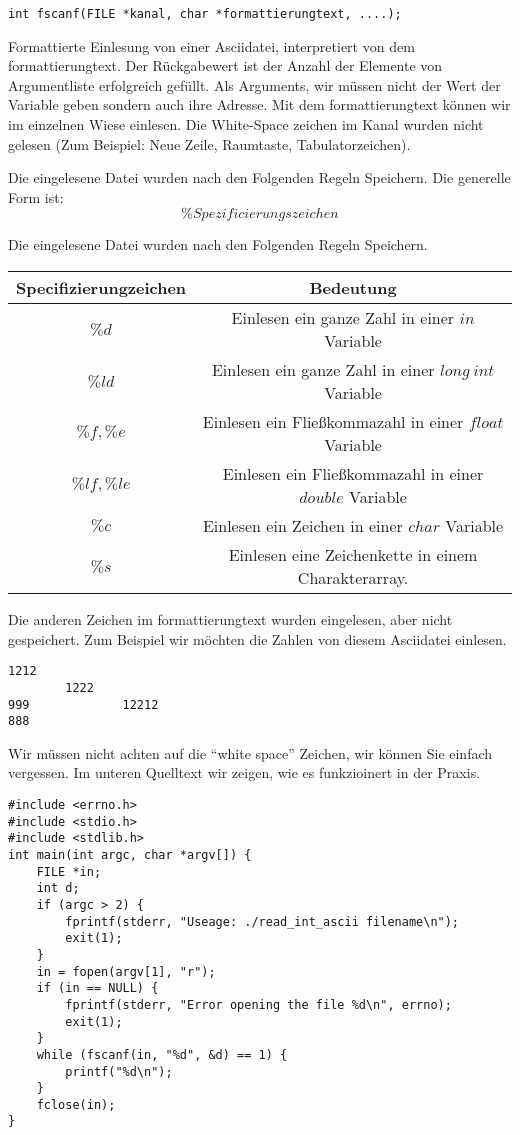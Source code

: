 \documentclass{article}[12pt]
\newenvironment{myexampleblock}[1]{%
    \tcolorbox[beamer,%
    noparskip,breakable,
    colback=White,colframe=ForestGreen,%
    colbacklower=LimeGreen!75!White,%
    title=#1]}%
    {\endtcolorbox}
\begin{document}
\begin{myexampleblock}{Funktion: \texttt{fscanf}}
\begin{lstlisting}
int fscanf(FILE *kanal, char *formattierungtext, ....);
\end{lstlisting}
Formattierte Einlesung von einer Asciidatei, interpretiert von dem formattierungtext. Der Rückgabewert ist der
Anzahl der Elemente von Argumentliste erfolgreich gefüllt. Als Arguments, wir müssen nicht der Wert der Variable geben
sondern auch ihre Adresse. Mit dem formattierungtext können wir im einzelnen Wiese einlesen.
Die White-Space zeichen im Kanal wurden nicht gelesen (Zum Beispiel: Neue Zeile, Raumtaste, Tabulatorzeichen).

Die eingelesene Datei wurden nach den Folgenden Regeln Speichern. Die generelle Form ist:
$$\%Spezificierungszeichen$$

Die eingelesene Datei wurden nach den Folgenden Regeln Speichern. 

\begin{center}
\begin{tabular}{|cc|}
\hline
Specifizierungzeichen & Bedeutung \\\hline
$\%d$	&  Einlesen ein ganze Zahl in einer $in$ Variable \\
$\%ld$  &  Einlesen ein ganze Zahl in einer $long~int$ Variable \\
$\%f,\%e$   & Einlesen ein Fließkommazahl in einer $float$ Variable \\
$\%lf,\%le$  & Einlesen ein Fließkommazahl in einer $double$ Variable \\
$\%c$  & Einlesen ein Zeichen in einer $char$ Variable \\
$\%s$  & Einlesen eine Zeichenkette in einem Charakterarray.\\
\hline
\end{tabular}
\end{center}

Die anderen Zeichen im formattierungtext wurden eingelesen, aber nicht gespeichert. 
\end{myexampleblock}
Zum Beispiel wir möchten die Zahlen von diesem Asciidatei einlesen.
\begin{lstlisting}
1212
        1222
999             12212
888
\end{lstlisting}
Wir müssen nicht achten auf die ``white space'' Zeichen, wir können Sie einfach vergessen.
Im unteren Quelltext wir zeigen, wie es funkzioinert in der Praxis.
\begin{lstlisting}
#include <errno.h>
#include <stdio.h>
#include <stdlib.h>
int main(int argc, char *argv[]) {
    FILE *in;
    int d;
    if (argc > 2) {
        fprintf(stderr, "Useage: ./read_int_ascii filename\n");
        exit(1);
    }
    in = fopen(argv[1], "r");
    if (in == NULL) {
        fprintf(stderr, "Error opening the file %d\n", errno);
        exit(1);
    }
    while (fscanf(in, "%d", &d) == 1) {
        printf("%d\n");
    }
    fclose(in);
}
\end{lstlisting}
\end{document}
